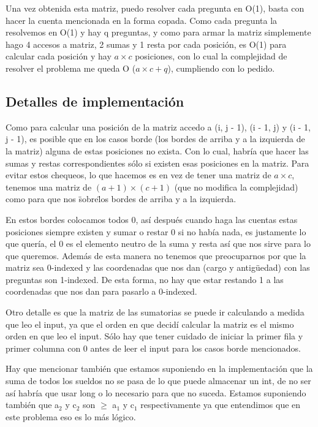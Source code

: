 Una vez obtenida esta matriz, puedo resolver cada pregunta en O(1), basta con hacer la cuenta mencionada en la forma copada. Como cada pregunta la resolvemos en O(1) y hay q preguntas, y como para armar la matriz simplemente hago 4 accesos a matriz, 2 sumas y 1 resta por cada posición, es O(1) para calcular cada posición y hay $a \times c$ posiciones, con lo cual la complejidad de resolver el problema me queda O ($a \times c + q$), cumpliendo con lo pedido.

\subsection {Detalles de implementación}

Como para calcular una posición de la matriz accedo a (i, j - 1),  (i - 1, j) y (i - 1, j - 1), es posible que en los casos borde (los bordes de arriba y a la izquierda de la matriz) alguna de estas posiciones no exista. Con lo cual, habría que hacer las sumas y restas correspondientes sólo si existen esas posiciones en la matriz. Para evitar estos chequeos, lo que hacemos es en vez de tener una matriz de $a \times c$, tenemos una matriz de $(a + 1) \times (c + 1)$ (que no modifica la complejidad) como para que nos \"sobre\" los bordes de arriba y a la izquierda. \newline

En estos bordes colocamos todos 0, así después cuando haga las cuentas estas posiciones siempre existen y sumar o restar 0 si no había nada, es justamente lo que quería, el 0 es el elemento neutro de la suma y resta así que nos sirve para lo que queremos. Además de esta manera no tenemos que preocuparnos por que la matriz sea 0-indexed y las coordenadas que nos dan (cargo y antigüedad) con las preguntas son 1-indexed. De esta forma, no hay que estar restando 1 a las coordenadas que nos dan para pasarlo a 0-indexed.\newline

Otro detalle es que la matriz de las sumatorias se puede ir calculando a medida que leo el input, ya que el orden en que decidí calcular la matriz es el mismo orden en que leo el input. Sólo hay que tener cuidado de iniciar la primer fila y primer columna con 0 antes de leer el input para los casos borde mencionados. \newline

Hay que mencionar también que estamos suponiendo en la implementación que la suma de todos los sueldos no se pasa de lo que puede almacenar un int, de no ser así habría que usar long o lo necesario para que no suceda. Estamos suponiendo también que a$_2$ y c$_2$ son $\geq$ a$_1$ y c$_1$ respectivamente ya que entendimos que en este problema eso es lo más lógico.


